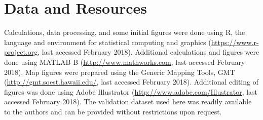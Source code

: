 
\section{Data and Resources}

Calculations, data processing, and some initial figures were done using R, the language and environment for statistical computing and graphics (\url{https://www.r-project.org}, last accessed February 2018). Additional calculations and figures were done using MATLAB B (\url{http://www.mathworks.com}, last accessed February 2018). Map figures were prepared using the Generic Mapping Tools, GMT (\url{http://gmt.soest.hawaii.edu/}, last accessed February 2018). Additional editing of figures was done using Adobe Illustrator (\url{http://www.adobe.com/Illustrator‎}, last accessed February 2018). The validation dataset used here was readily available to the authors and can be provided without restrictions upon request.
